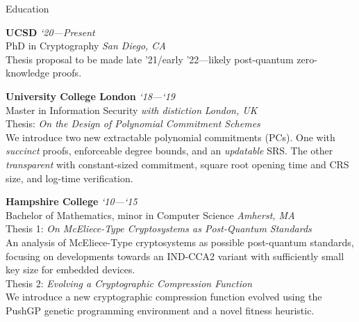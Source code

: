 \documentclass{cv}
\begin{document}
\begin{rSection}{Education}

\textbf{UCSD} \hfill \emph{`20---Present}  \\
PhD in Cryptography \hfill \emph{San Diego, CA} \\
{\small Thesis proposal to be made late '21/early '22---likely post-quantum zero-knowledge proofs.}

\textbf{University College London} \hfill \emph{`18---`19}  \\
Master in Information Security \emph{with distiction} \hfill \emph{London, UK} \\
Thesis: \emph{On the Design of Polynomial Commitment Schemes} \\
{\small We introduce two new extractable polynomial commitments (PCs). One with \emph{succinct} proofs, enforceable degree bounds, and an \emph{updatable} SRS. The other \emph{transparent} with constant-sized commitment, square root opening time and CRS size, and log-time verification.}

\textbf{Hampshire College} \hfill \emph{`10---`15} \\
Bachelor of Mathematics, minor in Computer Science \hfill \emph{Amherst, MA} \\
Thesis 1: \emph{On McEliece-Type Cryptosystems as Post-Quantum Standards} \\
{\small An analysis of McEliece-Type cryptosystems as possible post-quantum standards, focusing on developments towards an IND-CCA2 variant with sufficiently small key size for embedded devices.} \\
Thesis 2: \emph{Evolving a Cryptographic Compression Function} \\
{\small We introduce a new cryptographic compression function evolved using the PushGP genetic programming environment and a novel fitness heuristic.}

\end{rSection}
\end{document}
